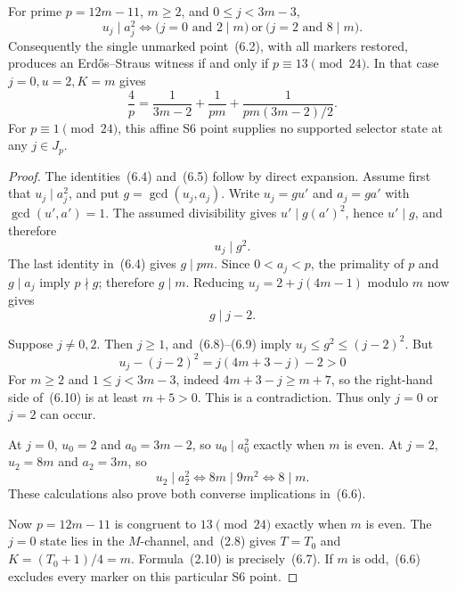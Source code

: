 \begin{theorem}\label{thm:esksb-affine-gate}
For prime \(p=12m-11\), \(m\geq2\), and \(0\leq j<3m-3\),
\begin{equation}
 u_j\mid a_j^2
 \Longleftrightarrow
 \bigl(j=0\text{ and }2\mid m\bigr)
 \ \text{or}\ 
 \bigl(j=2\text{ and }8\mid m\bigr).                       \tag{6.6}
\end{equation}
Consequently the single unmarked point~(6.2), with all markers restored,
produces an Erd\H{o}s--Straus witness if and only if
\(p\equiv13\pmod {24}\).  In that case \(j=0,u=2,K=m\) gives
\begin{equation}
 \frac4p=
 \frac1{3m-2}
 +\frac1{pm}
 +\frac{1}{pm(3m-2)/2}.                                    \tag{6.7}
\end{equation}
For \(p\equiv1\pmod {24}\), this affine S6 point supplies no supported
selector state at any \(j\in J_p\).
\end{theorem}

\begin{proof}
The identities~(6.4) and~(6.5) follow by direct expansion.  Assume first
that \(u_j\mid a_j^2\), and put \(g=\gcd(u_j,a_j)\).  Write
\(u_j=gu'\) and \(a_j=ga'\) with \(\gcd(u',a')=1\).  The assumed
divisibility gives \(u'\mid g(a')^2\), hence \(u'\mid g\), and therefore
\begin{equation}
 u_j\mid g^2.                                                \tag{6.8}
\end{equation}
The last identity in~(6.4) gives \(g\mid pm\).  Since \(0<a_j<p\), the
primality of \(p\) and \(g\mid a_j\) imply \(p\nmid g\); therefore
\(g\mid m\).  Reducing \(u_j=2+j(4m-1)\) modulo \(m\) now gives
\begin{equation}
 g\mid j-2.                                                  \tag{6.9}
\end{equation}

Suppose \(j\neq0,2\).  Then \(j\geq1\), and~(6.8)--(6.9) imply
\(u_j\leq g^2\leq(j-2)^2\).  But
\begin{equation}
 u_j-(j-2)^2=j(4m+3-j)-2>0                                  \tag{6.10}
\end{equation}
For \(m\geq2\) and \(1\leq j<3m-3\), indeed
\(4m+3-j\geq m+7\), so the right-hand side of~(6.10) is at least
\(m+5>0\).  This is a contradiction.  Thus only \(j=0\) or \(j=2\)
can occur.

At \(j=0\), \(u_0=2\) and \(a_0=3m-2\), so
\(u_0\mid a_0^2\) exactly when \(m\) is even.  At \(j=2\),
\(u_2=8m\) and \(a_2=3m\), so
\[
 u_2\mid a_2^2
 \Longleftrightarrow 8m\mid9m^2
 \Longleftrightarrow 8\mid m.
\]
These calculations also prove both converse implications in~(6.6).

Now \(p=12m-11\) is congruent to \(13\pmod {24}\) exactly when \(m\) is
even.  The \(j=0\) state lies in the \(M\)-channel, and~(2.8) gives
\(T=T_0\) and \(K=(T_0+1)/4=m\).  Formula~(2.10) is precisely~(6.7).
If \(m\) is odd,~(6.6) excludes every marker on this particular S6 point.
\end{proof}

